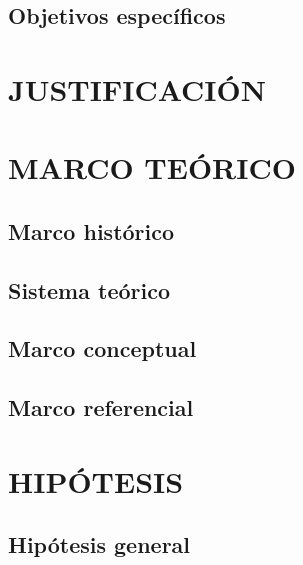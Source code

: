 \documentclass[12pt,a4paper]{article} %
\begin{document}
    \subsection{Objetivos específicos}
    	\lipsum[9]

			\lipsum[10]

			\lipsum[11]


\newpage
\section{\hspace{0.5mm} JUSTIFICACIÓN}
	\lipsum[10]

	\lipsum[11]

	\lipsum[12]

	\lipsum[13]

	\lipsum[14]


\newpage
\section{\hspace{0.5mm} MARCO TEÓRICO}
    \subsection{Marco histórico}
    	\lipsum[11]

    \subsection{Sistema teórico}
    	\lipsum[12]

    \subsection{Marco conceptual}
    	\lipsum[13]

    \subsection{Marco referencial}
    	\lipsum[14]


\newpage
\section{HIPÓTESIS}
    \subsection{Hipótesis general}
    	\lipsum[15]
\end{document}
